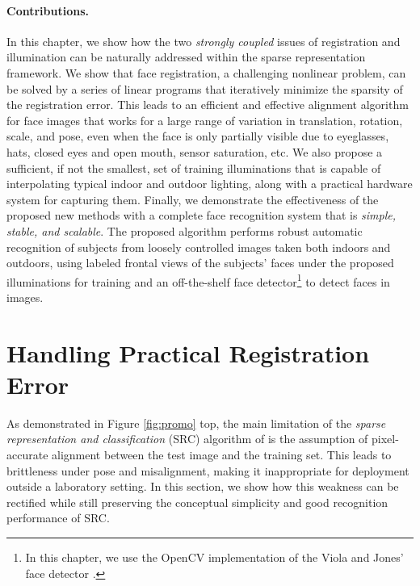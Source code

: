 \paragraph{Contributions.} In this chapter, we show how the two {\em strongly coupled} issues of registration and illumination can be naturally addressed within the sparse representation framework. We show that face registration, a challenging nonlinear problem, can be solved by a series of linear programs that iteratively minimize the sparsity of the registration error. This leads to an efficient and effective alignment algorithm for face images that works for a large range of variation in translation, rotation, scale, and pose, even when the face is only partially visible due to eyeglasses, hats, closed eyes and open mouth, sensor saturation, etc.  We also propose a sufficient, if not the smallest, set of training illuminations that is capable of interpolating typical indoor and outdoor lighting, along with a practical hardware system for capturing them.  Finally, we demonstrate the effectiveness of the proposed new methods with a complete face recognition system that is {\em simple, stable, and scalable}. 
The proposed algorithm performs robust automatic recognition of subjects from loosely controlled images taken both indoors and outdoors, using labeled frontal views of the subjects' faces under the proposed illuminations for training and an off-the-shelf face detector\footnote{In this chapter, we use the OpenCV implementation of the Viola and Jones' face detector \cite{Viola2004-IJCV}.} to detect faces in images. \vspace{0mm}

\section{Handling Practical Registration Error}\label{sec:registration}\vspace{0mm}
As demonstrated in Figure \ref{fig:promo} top, the main limitation of the {\em sparse representation and classification} (SRC) algorithm of \cite{Wright2009-PAMI} is the assumption of pixel-accurate alignment between the test image and the training set. This leads to brittleness under pose and misalignment, making it inappropriate for deployment outside a laboratory setting. In this section, we show how this weakness can be rectified while still preserving the conceptual simplicity and good recognition performance of SRC. 

